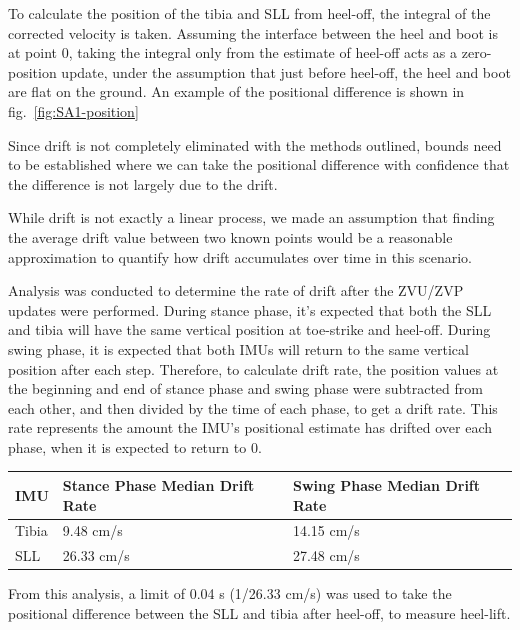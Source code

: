 \documentclass[defaultstyle,11pt]{comps}
\begin{document}
To calculate the position of the tibia and SLL from heel-off, the integral of the corrected velocity is taken.
Assuming the interface between the heel and boot is at point 0, taking the integral only from the estimate of heel-off acts as a zero-position update, under the assumption that just before heel-off, the heel and boot are flat on the ground. An example of the positional difference is shown in fig.~\ref{fig:SA1-position}

Since drift is not completely eliminated with the methods outlined, bounds need to be established where we can take the positional difference with confidence that the difference is not largely due to the drift.

While drift is not exactly a linear process, we made an assumption that finding the average drift value between two known points would be a reasonable approximation to quantify how drift accumulates over time in this scenario.

Analysis was conducted to determine the rate of drift after the ZVU/ZVP updates were performed.
During stance phase, it's expected that both the SLL and tibia will have the same vertical position at toe-strike and heel-off.
During swing phase, it is expected that both IMUs will return to the same vertical position after each step.
Therefore, to calculate drift rate, the position values at the beginning and end of stance phase and swing phase were subtracted from each other, and then divided by the time of each phase, to get a drift rate.
This rate represents the amount the IMU's positional estimate has drifted over each phase, when it is expected to return to 0.

\begin{longtable}[]{@{}lll@{}}
\toprule
IMU & Stance Phase Median Drift Rate & Swing Phase Median Drift Rate\tabularnewline
\midrule
\endhead
Tibia & 9.48 cm/s & 14.15 cm/s\tabularnewline
SLL & 26.33 cm/s & 27.48 cm/s\tabularnewline
\bottomrule
\end{longtable}

From this analysis, a limit of 0.04 s (1/26.33 cm/s) was used to take the positional difference between the SLL and tibia after heel-off, to measure heel-lift.
\end{document}

